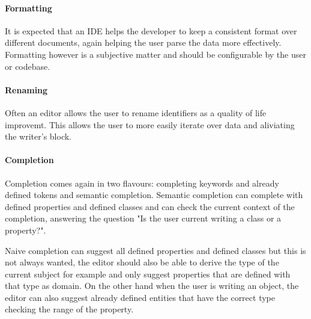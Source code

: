 \paragraph*{Formatting}

It is expected that an IDE helps the developer to keep a consistent format over different documents, again helping the user parse the data more effectively.
Formatting however is a subjective matter and should be configurable by the user or codebase.

\paragraph*{Renaming}
Often an editor allows the user to rename identifiers as a quality of life improvemt.
This allows the user to more easily iterate over data and aliviating the writer's block.


\paragraph*{Completion}

Completion comes again in two flavours: completing keywords and already defined tokens and semantic completion.
Semantic completion can complete with defined properties and defined classes and can check the current context of the completion, answering the question "Is the user current writing a class or a property?".

Naive completion can suggest all defined properties and defined classes but this is not always wanted, the editor should also be able to derive the type of the current subject for example and only suggest properties that are defined with that type as domain.
On the other hand when the user is writing an object, the editor can also suggest already defined entities that have the correct type checking the range of the property.



